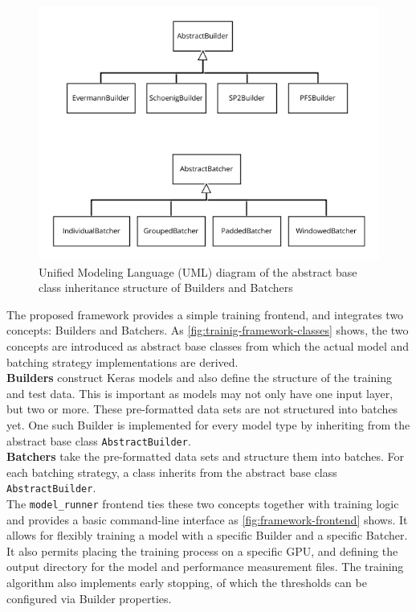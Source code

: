 \begin{figure}
    \centering
    \includegraphics[width=\textwidth]{gfx/training-framework-classes.png}
    \caption[UML diagram of the framework classes]{Unified Modeling Language (UML) diagram of the abstract base class inheritance structure of Builders and Batchers}
    \label{fig:trainig-framework-classes}
\end{figure}

The proposed framework provides a simple training frontend, and integrates two concepts: Builders and Batchers. As \autoref{fig:trainig-framework-classes} shows, the two concepts are introduced as abstract base classes from which the actual model and batching strategy implementations are derived.\\

\noindent\textbf{Builders} construct Keras models and also define the structure of the training and test data. This is important as models may not only have one input layer, but two or more. These pre-formatted data sets are not structured into batches yet. One such Builder is implemented for every model type by inheriting from the abstract base class \verb=AbstractBuilder=.\\

\noindent\textbf{Batchers} take the pre-formatted data sets and structure them into batches. For each batching strategy, a class inherits from the abstract base class \verb=AbstractBuilder=.\\

\noindent The \verb=model_runner= frontend ties these two concepts together with training logic and provides a basic command-line interface as \autoref{fig:framework-frontend} shows. It allows for flexibly training a model with a specific Builder and a specific Batcher. It also permits placing the training process on a specific GPU, and defining the output directory for the model and performance measurement files. The training algorithm also implements early stopping, of which the thresholds can be configured via Builder properties.\\

